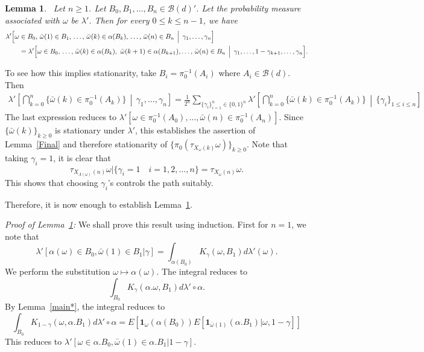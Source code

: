 \documentclass[final]{aomart}
\def\mathbb#1{#1}%
\theoremstyle{plain}
\newtheorem{lemma}[theorem]{Lemma}
\theoremstyle{definition}
\theoremstyle{remark}
\begin{document}
\begin{lemma}~\label{main**} 
Let $ n \geq 1$. Let $B_0, B_1,\dots,B_n \in \mathcal{B}(d)' $. Let the probability measure associated with $\omega$ be $\lambda'$. Then for every $0\leq k \leq n-1$, we have\begin{align*}
&\lambda'\Bigl[
    \omega \in B_0,\,
    \bar{\omega}(1) \in B_1,\,
    \ldots,\,
    \bar{\omega}(k) \in \alpha(B_{k}),\,
    \ldots,\,
    \bar{\omega}(n) \in B_n
    \,\Bigm|\,
    \gamma_1,\ldots,\gamma_n
\Bigr] \nonumber \\
&\qquad =
\lambda'\Bigl[
    \omega \in B_0,\,
    \ldots,\,
    \bar{\omega}(k) \in \alpha(B_{k}),\ \bar{\omega}(k+1) \in \alpha(B_{k+1}),
    \ldots,\,
    \bar{\omega}(n) \in B_n
    \,\Bigm|\,
    \gamma_1,\ldots,1-\gamma_{k+1},\ldots,\gamma_n
\Bigr].
\end{align*}

\end{lemma}
To see how this implies stationarity, take $B_i = \pi_0^{-1}(A_i)$ where $A_i \in \mathcal{B}(d)$. Then \begin{align*}
\lambda' \left[ \bigcap_{k=0}^n \{ \bar{\omega}(k) \in \pi_0^{-1}(A_k) \} \,\middle|\, \gamma_1,\dots, \gamma_n \right] = \frac{1}{2^n} \sum_{\{\gamma_i\}_{i=1}^n \in \{0,1\}^n} \lambda' \left[ \bigcap_{k=0}^n \{ \bar{\omega}(k) \in \pi_0^{-1}(A_k) \} \,\middle|\, \{\gamma_i\}_{1\leq i\leq n} \right]
\end{align*}
The last expression reduces to $\lambda'[ \omega \in \pi_0^{-1} (A_0),\dots,\bar{\omega}(n) \in \pi_0^{-1}(A_n)]$. Since $\{\bar{\omega}(k)\}_{k \geq 0}$ is stationary under $\lambda'$, this establishes the assertion of Lemma~\ref{Final} and therefore stationarity of $\{\pi_0(\tau_{X_{\omega}(k)} \omega) \}_{k \geq 0}$. Note that taking $\gamma_i=1$, it is clear that \[
\tau_{X_{\Lambda(\omega)}(n)} \omega |\{\gamma_i=1\quad i=1,2,\dots,n\} = \tau_{X_{\omega}(n)} \omega. 
\]
This shows that choosing $\gamma_i$'s controls the path suitably. 

Therefore, it is now enough to establish Lemma~\ref{main**}. 

\textit{Proof of Lemma~\ref{main**}:} We shall prove this result using induction. First for $n=1$, we note that \[
\lambda'[\alpha(\omega) \in B_0,\bar{\omega}(1) \in B_1|\gamma] = \int_{\alpha(B_0)} K_{\gamma}(\omega,B_1) d\lambda'(\omega).
\]
We perform the substitution $\omega \mapsto \alpha(\omega)$. The integral reduces to \[
\int_{B_0} K_{\gamma} (\alpha.\omega, B_1) d \lambda' \circ \alpha .
\]
By Lemma~\ref{main*}, the integral reduces to \[
\int_{B_0} K_{1-\gamma} (\omega, \alpha.B_1) d \lambda' \circ \alpha = \mathbb{E}[\boldsymbol{1}_{\omega} (\alpha(B_0)) \mathbb{E}[\boldsymbol{1}_{\bar{\omega}(1)}(\alpha.B_1)\Big|\omega,1-\gamma]]
\]
This reduces to $\lambda'[\omega\in \alpha.B_0, \bar{\omega}(1)\in \alpha.B_1| 1-\gamma]$. 
\end{document}
